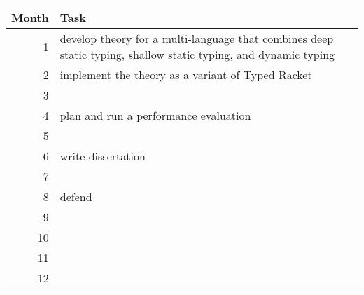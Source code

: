 \begin{tabular}{rl}
  Month & Task \\\hline
  1     & develop theory for a multi-language that combines deep static typing, shallow static typing, and dynamic typing
  \\
  2     & implement the theory as a variant of Typed Racket
  \\
  3     &
  \\
  4     & plan and run a performance evaluation
  \\
  5     &
  \\
  6     & write dissertation
  \\
  7     &
  \\
  8     & defend
  \\
  9     &
  \\
  10    &
  \\
  11    &
  \\
  12    &
\end{tabular}
